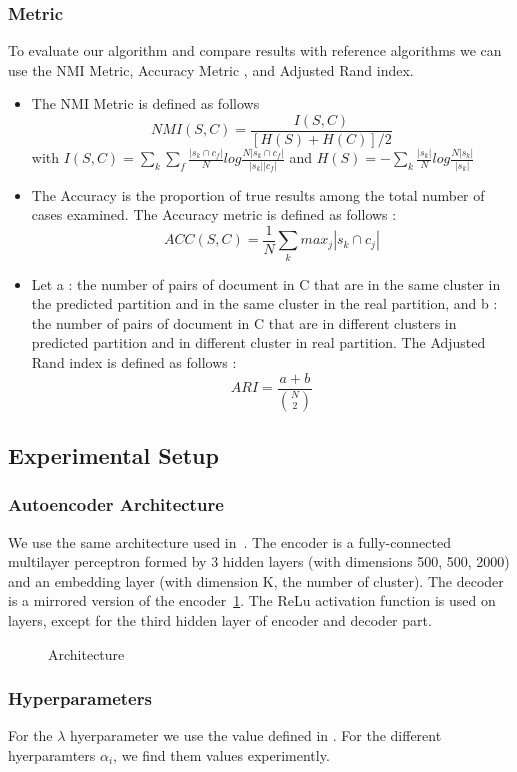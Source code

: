 \subsubsection{Metric}
To evaluate our algorithm and compare results with reference algorithms we can
use the NMI Metric, Accuracy Metric \cite{NMI_ACC}, and Adjusted
Rand index\cite{ARI}. 
\begin{itemize}
\item The NMI Metric is defined as follows
$$NMI(S,C) = \frac{I(S,C)}{[H(S)+H(C)]/2}$$ 
with
$I(S,C) =\sum_k \sum_f\frac{|s_k \cap c_f|}{N}log\frac{N|s_k \cap c_f|}{|s_k| |c_f|}$
and
$H(S) = -\sum_k\frac{|s_k|}{N}log\frac{N|s_k|}{|s_k|}$
\item The Accuracy is the proportion of true results among the total
  number of cases examined. The Accuracy metric is defined as follows :
$$
ACC(S,C) = \frac{1}{N}\sum_k {max}_j|s_k \cap c_j|
$$
\item Let a : the number of pairs of document in C
  that are in the same cluster in the predicted partition and in the
  same cluster in the real partition, and b : the number of pairs of
  document in C that are in different clusters in predicted partition
  and in different cluster in real partition.
  The Adjusted Rand index is defined as follows :
  $$ARI = \frac{a+b}{\binom{N}{2}}$$
\end{itemize}
\subsection{Experimental Setup}
\subsubsection{Autoencoder Architecture}
We use the same architecture used in~\cite{Deap-K-Means}. The encoder is a fully-connected 
multilayer perceptron formed by 3 hidden layers (with dimensions 500, 500, 2000) 
and an embedding layer (with dimension K, the number of cluster). 
The decoder is a mirrored version of the encoder~\ref{fig:archi}.
The ReLu activation function is used on layers, except for the third
hidden layer of encoder and decoder part.  
\begin{figure}[!h]
  \centering
  
  \caption{\label{fig:archi}Architecture}
\end{figure}
 
\subsubsection{Hyperparameters}
For the $\lambda$ hyerparameter we use the value defined in \cite{Deap-K-Means}. 
For the different hyerparamters $\alpha_i$, we find them values experimently.

